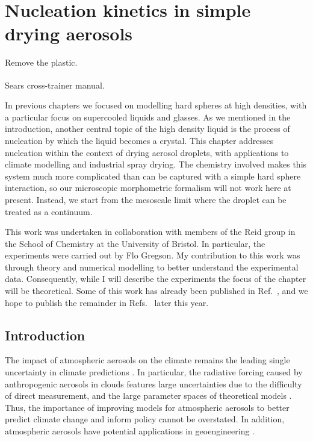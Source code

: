 \documentclass[11pt,twoside]{report}
\begin{document}
\chapter{Nucleation kinetics in simple drying aerosols}
\epigraph{Remove the plastic.}{Sears\textsuperscript{\textregistered} cross-trainer manual.}
\label{chapter:aerosols}

In previous chapters we focused on modelling hard spheres at high densities, with a particular focus on supercooled liquids and glasses.
As we mentioned in the introduction, another central topic of the high density liquid is the process of nucleation by which the liquid becomes a crystal.
This chapter addresses nucleation within the context of drying aerosol droplets, with applications to climate modelling and industrial spray drying.
The chemistry involved makes this system much more complicated than can be captured with a simple hard sphere interaction, so our microscopic morphometric formalism will not work here at present.
Instead, we start from the mesoscale limit where the droplet can be treated as a continuum.

This work was undertaken in collaboration with members of the Reid group in the School of Chemistry at the University of Bristol.
In particular, the experiments were carried out by Flo Gregson.
My contribution to this work was through theory and numerical modelling to better understand the experimental data.
Consequently, while I will describe the experiments the focus of the chapter will be theoretical.
Some of this work has already been published in Ref.\ \cite{GregsonJPCB2019}, and we hope to publish the remainder in Refs.\ \cite{RobinsonTBD2019,GregsonTBD2019} later this year.

\section{Introduction}

The impact of atmospheric aerosols on the climate remains the leading single uncertainty in climate predictions \cite{BoucherIPCC2013,CarslawN2013,LeePNAS2016,RegayreACP2018}.
In particular, the radiative forcing caused by anthropogenic aerosols in clouds features large uncertainties due to the difficulty of direct measurement, and the large parameter spaces of theoretical models \cite{LeePNAS2016}.
Thus, the importance of improving models for atmospheric aerosols to better predict climate change and inform policy cannot be overstated.
In addition, atmospheric aerosols have potential applications in geoengineering \cite{PringleACP2012}.
\end{document}
